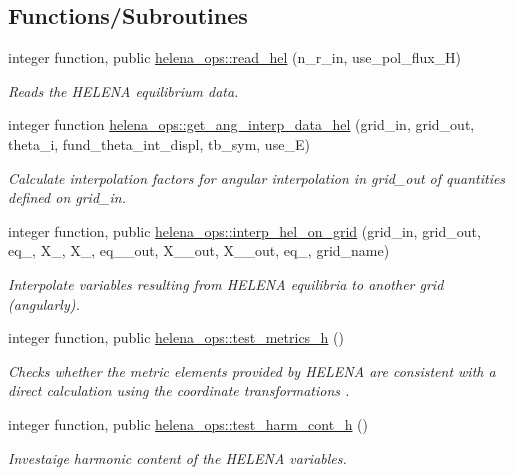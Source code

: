 \subsection*{Functions/\+Subroutines}
\begin{DoxyCompactItemize}
\item 
integer function, public \hyperlink{namespacehelena__ops_ae05ba1182eb002d93c27ca4ff7ab8cf2}{helena\+\_\+ops\+::read\+\_\+hel} (n\+\_\+r\+\_\+in, use\+\_\+pol\+\_\+flux\+\_\+H)
\begin{DoxyCompactList}\small\item\em Reads the H\+E\+L\+E\+NA equilibrium data. \end{DoxyCompactList}\item 
integer function \hyperlink{namespacehelena__ops_ab1329afe5af2ff92d96f4be15a096b38}{helena\+\_\+ops\+::get\+\_\+ang\+\_\+interp\+\_\+data\+\_\+hel} (grid\+\_\+in, grid\+\_\+out, theta\+\_\+i, fund\+\_\+theta\+\_\+int\+\_\+displ, tb\+\_\+sym, use\+\_\+E)
\begin{DoxyCompactList}\small\item\em Calculate interpolation factors for angular interpolation in {\ttfamily grid\+\_\+out} of quantities defined on {\ttfamily grid\+\_\+in}. \end{DoxyCompactList}\item 
integer function, public \hyperlink{namespacehelena__ops_a7796861de18ae7ac9c3aa07a8628be38}{helena\+\_\+ops\+::interp\+\_\+hel\+\_\+on\+\_\+grid} (grid\+\_\+in, grid\+\_\+out, eq\+\_, X\+\_, X\+\_, eq\+\_\+\_\+out, X\+\_\+\_\+out, X\+\_\+\_\+out, eq\+\_, grid\+\_\+name)
\begin{DoxyCompactList}\small\item\em Interpolate variables resulting from H\+E\+L\+E\+NA equilibria to another grid (angularly). \end{DoxyCompactList}\item 
integer function, public \hyperlink{namespacehelena__ops_a0f156b3653264fb016d6d311eb59114c}{helena\+\_\+ops\+::test\+\_\+metrics\+\_\+h} ()
\begin{DoxyCompactList}\small\item\em Checks whether the metric elements provided by H\+E\+L\+E\+NA are consistent with a direct calculation using the coordinate transformations \cite{Weyens3D}. \end{DoxyCompactList}\item 
integer function, public \hyperlink{namespacehelena__ops_a83f2ad5dc967c7bae287b60fddb8eb0a}{helena\+\_\+ops\+::test\+\_\+harm\+\_\+cont\+\_\+h} ()
\begin{DoxyCompactList}\small\item\em Investaige harmonic content of the H\+E\+L\+E\+NA variables. \end{DoxyCompactList}\end{DoxyCompactItemize}
